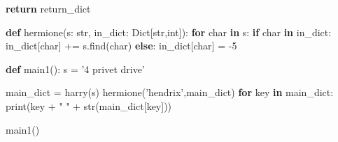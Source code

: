 \documentclass[]{article}
\newenvironment{Shaded}{}{}
\newcommand{\KeywordTok}[1]{\textcolor[rgb]{0.00,0.44,0.13}{\textbf{#1}}}
\newcommand{\DecValTok}[1]{\textcolor[rgb]{0.25,0.63,0.44}{#1}}
\newcommand{\StringTok}[1]{\textcolor[rgb]{0.25,0.44,0.63}{#1}}
\newcommand{\ControlFlowTok}[1]{\textcolor[rgb]{0.00,0.44,0.13}{\textbf{#1}}}
\newcommand{\OperatorTok}[1]{\textcolor[rgb]{0.40,0.40,0.40}{#1}}
\newcommand{\BuiltInTok}[1]{#1}
\newcommand{\NormalTok}[1]{#1}
\begin{document}
\begin{enumerate}
\begin{Shaded}
\begin{Highlighting}[]
    \ControlFlowTok{return}\NormalTok{ return_dict}

\KeywordTok{def}\NormalTok{ hermione(s: }\BuiltInTok{str}\NormalTok{, in_dict: Dict[}\BuiltInTok{str}\NormalTok{,}\BuiltInTok{int}\NormalTok{]):}
    \ControlFlowTok{for}\NormalTok{ char }\KeywordTok{in}\NormalTok{ s:}
        \ControlFlowTok{if}\NormalTok{ char }\KeywordTok{in}\NormalTok{ in_dict:}
\NormalTok{            in_dict[char] }\OperatorTok{+=}\NormalTok{ s.find(char)}
        \ControlFlowTok{else}\NormalTok{:}
\NormalTok{            in_dict[char] }\OperatorTok{=} \DecValTok{-5}

\KeywordTok{def}\NormalTok{ main1():}
\NormalTok{    s }\OperatorTok{=} \StringTok{'4 privet drive'}

\NormalTok{    main_dict }\OperatorTok{=}\NormalTok{ harry(s)}
\NormalTok{    hermione(}\StringTok{'hendrix'}\NormalTok{,main_dict)}
    \ControlFlowTok{for}\NormalTok{ key }\KeywordTok{in}\NormalTok{ main_dict:}
        \BuiltInTok{print}\NormalTok{(key }\OperatorTok{+} \StringTok{" "} \OperatorTok{+} \BuiltInTok{str}\NormalTok{(main_dict[key]))}

\NormalTok{main1()}
\end{Highlighting}
\end{Shaded}
\end{enumerate}
\end{document}
